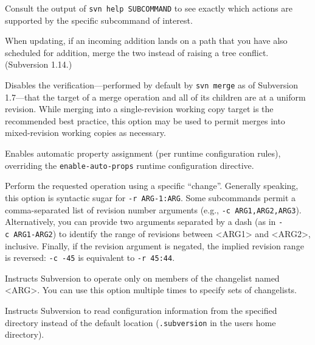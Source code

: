 \begin{description}
Consult the output of \texttt{svn\ help\ SUBCOMMAND} to see exactly
which actions are supported by the specific subcommand of interest.
\item[\protect\phantomsection\label{svn.ref.svn.sw.adds_as_modification}{}\texttt{-\/-adds-as-modification}]
When updating, if an incoming addition lands on a path that you have also
scheduled for addition, merge the two instead of raising a tree conflict.
(Subversion 1.14.)
\item[\protect\phantomsection\label{svn.ref.svn.sw.allow_mixed_revisions}{}\texttt{-\/-allow-mixed-revisions}]
Disables the verification---performed by default by \texttt{svn\ merge}
as of Subversion 1.7---that the target of a merge operation and all of
its children are at a uniform revision. While merging into a
single-revision working copy target is the recommended best practice,
this option may be used to permit merges into mixed-revision working
copies as necessary.
\item[\protect\phantomsection\label{svn.ref.svn.sw.auto_props}{}\texttt{-\/-auto-props}]
Enables automatic property assignment (per runtime configuration rules),
overriding the \texttt{enable-auto-props} runtime configuration
directive.
\item[\protect\phantomsection\label{svn.ref.svn.sw.change}{}\texttt{-\/-change}
(\texttt{-c}) \textless ARG\textgreater{}]
Perform the requested operation using a specific ``change''. Generally
speaking, this option is syntactic sugar for \texttt{-r\ ARG-1:ARG}.
Some subcommands permit a comma-separated list of revision number
arguments (e.g., \texttt{-c\ ARG1,ARG2,ARG3}). Alternatively, you can
provide two arguments separated by a dash (as in \texttt{-c\ ARG1-ARG2})
to identify the range of revisions between \textless ARG1\textgreater{}
and \textless ARG2\textgreater, inclusive. Finally, if the revision
argument is negated, the implied revision range is reversed:
\texttt{-c\ -45} is equivalent to \texttt{-r\ 45:44}.
\item[\protect\phantomsection\label{svn.ref.svn.sw.changelist}{}\texttt{-\/-changelist}
(\texttt{-\/-cl}) \textless ARG\textgreater{}]
Instructs Subversion to operate only on members of the changelist named
\textless ARG\textgreater. You can use this option multiple times to
specify sets of changelists.
\item[\protect\phantomsection\label{svn.ref.svn.sw.config_dir}{}\texttt{-\/-config-dir}
\textless DIR\textgreater{}]
Instructs Subversion to read configuration information from the
specified directory instead of the default location
(\texttt{.subversion} in the user\textquotesingle s home directory).


\end{description}
